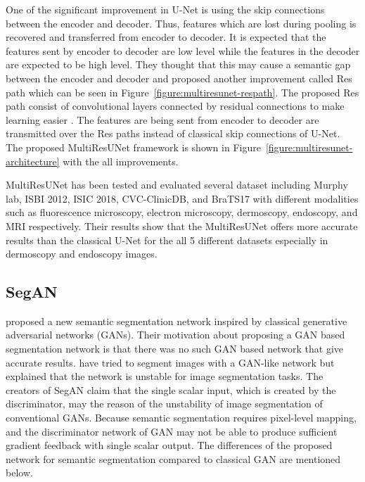         One of the significant improvement in U-Net is using the skip connections between the encoder and decoder.
        Thus, features which are lost during pooling is recovered and transferred from encoder to decoder.
        It is expected that the features sent by encoder to decoder are low level while the features in the decoder are expected to be high level.
        They thought that this may cause a semantic gap between the encoder and decoder and proposed another improvement called Res path which can be seen in Figure~\ref{figure:multiresunet-respath}.
        The proposed Res path consist of convolutional layers connected by residual connections to make learning easier \cite{drozdzal2016importance}.
        The features are being sent from encoder to decoder are transmitted over the Res paths instead of classical skip connections of U-Net.
        The proposed MultiResUNet framework is shown in Figure~\ref{figure:multiresunet-architecture} with the all improvements.

        

        MultiResUNet has been tested and evaluated several dataset including Murphy lab, ISBI 2012, ISIC 2018, CVC-ClinicDB, and BraTS17
        with different modalities such as fluorescence microscopy, electron microscopy, dermoscopy, endoscopy, and MRI respectively.
        Their results show that the MultiResUNet offers more accurate results than the classical U-Net for the all 5 different datasets especially in dermoscopy and endoscopy images.

    \subsection{SegAN}\label{section:segan}

        \citet{xue2018segan} proposed a new semantic segmentation network inspired by classical generative adversarial networks (GANs).
        Their motivation about proposing a GAN based segmentation network is that there was no such GAN based network that give accurate results.
        \citet{luc2016semantic} have tried to segment images with a GAN-like network but explained that the network is unstable for image segmentation tasks.
        The creators of SegAN claim that the single scalar input, which is created by the discriminator,  may the reason of the unstability of image segmentation of conventional GANs.
        Because semantic segmentation requires pixel-level mapping, and the discriminator network of GAN may not be able to produce sufficient gradient feedback with single scalar output.
        The differences of the proposed network for semantic segmentation compared to classical GAN ​​are mentioned below.

